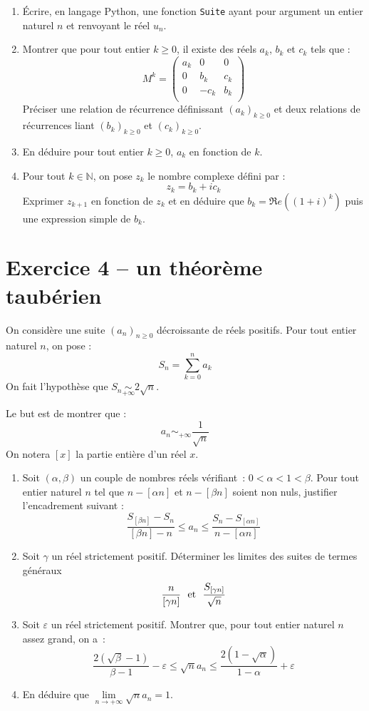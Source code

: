 \documentclass[twoside,french,11pt]{VcCours}
\begin{document}
\begin{enumerate}
\item Écrire, en langage Python, une fonction {\tt Suite} ayant pour argument un entier naturel $n$ et renvoyant le réel $u_n$.
\item Montrer que pour tout entier $k \geq 0$, il existe des réels $a_k$, $b_k$ et $c_k$ tels que :
$$ M^k = \begin{pmatrix}
a_k & 0 & 0 \\
0 & b_k & c_k \\
0 & -c_k & b_k \\
\end{pmatrix}$$
Préciser une relation de récurrence définissant $(a_k)_{k \geq 0}$ et deux relations de récurrences liant $(b_k)_{k \geq 0}$ et $(c_k)_{k \geq 0}$.
\item En déduire pour tout entier $k \geq 0$, $a_k$ en fonction de $k$.
\item Pour tout $k \in \mathbb{N}$, on pose $z_k$ le nombre complexe défini par :
$$ z_k = b_k + i c_k$$
Exprimer $z_{k+1}$ en fonction de $z_k$ et en déduire que $b_k = \Re e((1+i)^k)$ puis une expression simple de $b_k$.
\end{enumerate}

\section*{Exercice 4 -- un théorème taubérien}
On considère une suite $(a_n)_{n \geq 0}$ décroissante de réels positifs. 
Pour tout entier naturel $n$, on pose : $$S_n=\sum_{k=0}^na_k$$
On fait l'hypothèse que  $S_n \underset{+\infty}{\sim} 2\sqrt{n}$.

\medskip

Le but est de montrer que :
\[a_n\mathop{\sim}_{ +\infty}\frac{1}{\sqrt{n}}\]
On notera $[x]$ la partie entière d'un réel $x$.
\begin{enumerate}
  \item Soit $(\alpha,\beta)$ un couple de nombres réels vérifiant~: $0<\alpha<1<\beta$. Pour tout entier naturel $n$ tel que $n-[\alpha n]$ et $n-[\beta n]$ soient non nuls, justifier l'encadrement suivant :
  \[\frac{S_{[\beta n]}-S_n}{[\beta n]-n}\leq a_n\leq \frac{S_n-S_{[\alpha n]}}{n-[\alpha n]}\]
  \item Soit $\gamma$ un réel strictement positif. Déterminer les limites des suites de termes généraux
  \[\frac{n}{[\gamma n]}\ \makebox{ et }\ \frac{S_{[\gamma n]}}{\sqrt{n}}\]
  \item Soit $\varepsilon$ un réel strictement positif. Montrer que, pour tout entier naturel $n$ assez grand, on a~:
  \[\frac{2(\sqrt{\beta}-1)}{\beta-1}-\varepsilon \leq \sqrt{n}a_n\leq \frac{2(1-\sqrt{\alpha})}{1-\alpha}+\varepsilon\]
  \item En déduire que $\lim\limits_{n\to +\infty}\sqrt{n}a_n=1$.
\end{enumerate}
\end{document}
